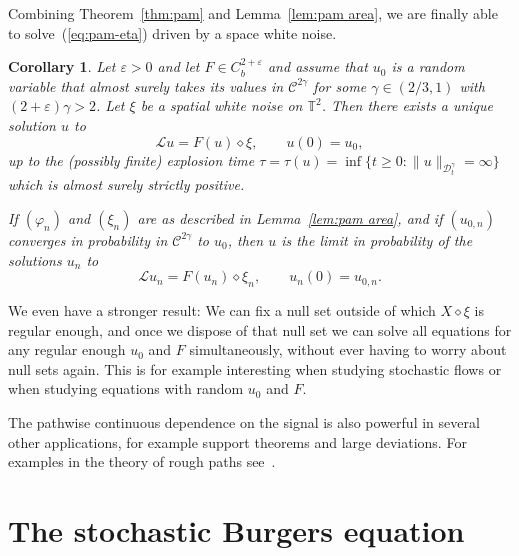 \documentclass[a4paper,11pt]{article}
\newtheorem{corollary}{Corollary}
\newcommand{\LL}{\mathscr{L}}
\newcommand{\CC}{\mathscr{C}}
\newcommand{\CD}{\mathscr{D}}
\newcommand{\renorm}{\,\mathord{\diamond}\,}
\begin{document}
Combining Theorem~\ref{thm:pam} and Lemma~\ref{lem:pam area}, we are finally
able to solve~(\ref{eq:pam-eta}) driven by a space white noise.

\begin{corollary}
  Let $\varepsilon > 0$ and let $F \in C^{2 + \varepsilon}_b$ and assume that
  $u_0$ is a random variable that almost surely takes its values in $\CC^{2
  \gamma}$ for some $\gamma \in (2 / 3, 1)$ with $(2 + \varepsilon) \gamma >
  2$. Let $\xi$ be a spatial white noise on $\mathbb{T}^2$. Then there exists
  a unique solution $u$ to
  \[ \LL u = F (u) \renorm \xi, \hspace{2em} u (0) = u_0, \]
  up to the (possibly finite) explosion time $\tau = \tau (u) = \inf \{ t
  \geqslant 0 : \| u \|_{\CD^{\gamma}_t} = \infty \}$ which is almost
  surely strictly positive.
  
  If $(\varphi_n)$ and $(\xi_n)$ are as described in Lemma~\ref{lem:pam area},
  and if $(u_{0, n})$ converges in probability in $\CC^{2 \gamma}$ to $u_0$,
  then $u$ is the limit in probability of the solutions $u_n$ to
  \[ \LL u_n = F (u_n) \renorm \xi_n, \hspace{2em} u_n (0) = u_{0,n} . \]
\end{corollary}

\begin{remark}
  We even have a stronger result: We can fix a null set outside of which $X
  \renorm \xi$ is regular enough, and once we dispose of that null set we can
  solve all equations for any regular enough $u_0$ and $F$ simultaneously,
  without ever having to worry about null sets again. This is for example
  interesting when studying stochastic flows or when studying equations with
  random $u_0$ and $F$.
  
  The pathwise continuous dependence on the signal is also powerful in several
  other applications, for example support theorems and large deviations. For
  examples in the theory of rough paths see~{\cite{Friz2010}}.
\end{remark}

\section{The stochastic Burgers equation}\label{sec:rbe}
\end{document}
